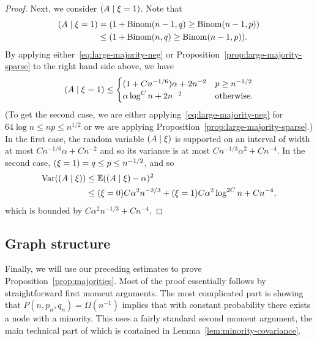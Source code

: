 \documentclass[EJP]{ejpecp}
\newcommand{\E}{\mathbb{E}}
\newcommand{\1}[1]{\mathbbm{1}_{\{#1\}}}
\let\Pr\relax
\DeclareMathOperator{\Pr}{Pr}
\DeclareMathOperator{\Var}{Var}
\DeclareMathOperator{\Binom}{Binom}
\begin{document}
\begin{proof}
 Next, we consider $\Pr(A \mid \xi = 1)$. Note that
 \begin{align*}
  \Pr(A \mid \xi = 1)
  &= \Pr(1 + \Binom(n-1, q) \ge \Binom(n-1, p)) \notag \\
  &\le \Pr(1 + \Binom(n, q) \ge \Binom(n-1, p)).
 \end{align*}
 By applying either~\eqref{eq:large-majority-neg}
 or Proposition~\ref{prop:large-majority-sparse}
 to the right hand side above, we have
 \[
   \Pr(A \mid \xi = 1) \le \begin{cases}
     (1 + C n^{-1/6}) \alpha + 2 n^{-2} & \text{$p \ge n^{-1/2}$} \\
     \alpha \log^C n + 2 n^{-2} & \text{otherwise}.
   \end{cases}
 \]
 (To get the second case, we are either applying~\eqref{eq:large-majority-neg}
 for $64 \log n \le np \le n^{1/2}$ or we are applying
 Proposition~\ref{prop:large-majority-sparse}.)
 In the first case, the random variable $\Pr(A \mid \xi)$
 is supported on an interval of width at most
 $C n^{-1/6} \alpha + C n^{-2}$ and so its variance is at most
 $C n^{-1/3} \alpha^2 + C n^{-4}$.
 In the second case, $\Pr(\xi = 1) = q \le p \le n^{-1/2}$,
 and so
 \begin{align*}
   \Var(\Pr(A \mid \xi))
   &\le \E (\Pr(A \mid \xi) - \alpha)^2 \\
   &\le \Pr(\xi = 0) C \alpha^ 2n^{-2/3} + \Pr(\xi = 1) C \alpha^2 \log^{2C} n + Cn^{-4},
 \end{align*}
 which is bounded by $C \alpha^2 n^{-1/3} + Cn^{-4}$.
\end{proof}

\subsection{Graph structure}
 Finally, we will use our preceding estimates to prove
 Proposition~\ref{prop:majorities}. Most of the proof essentially follows
 by straightforward first moment arguments. The most complicated part
 is showing that $P(n, p_n, q_n) = \Omega(n^{-1})$ implies that with constant probability there exists a
 node with a minority. This uses a fairly standard second
 moment argument,
 the main technical part of which is contained in
 Lemma~\ref{lem:minority-covariance}.
\end{document}

